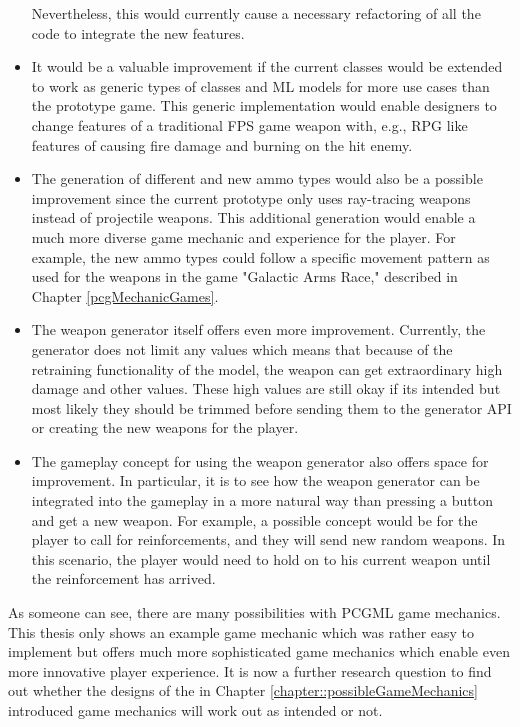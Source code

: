 \documentclass[MGS,Master,english]{twbook}%
\newcommand{\FHTWCitationType}{HARVARD} %
\begin{document}
\begin{itemize}
	Nevertheless, this would currently cause a necessary refactoring of all the code to integrate the new features.
	\item It would be a valuable improvement if the current classes would be extended to work as generic types of classes and \ac{ML} models for more use cases than the prototype game. This generic implementation would enable designers to change features of a traditional \ac{FPS} game weapon with, e.g., \ac{RPG} like features of causing fire damage and burning on the hit enemy.
	\item The generation of different and new ammo types would also be a possible improvement since the current prototype only uses ray-tracing weapons instead of projectile weapons. This additional generation would enable a much more diverse game mechanic and experience for the player. For example, the new ammo types could follow a specific movement pattern as used for the weapons in the game "Galactic Arms Race," described in Chapter \ref{pcgMechanicGames}.
	\item The weapon generator itself offers even more improvement. Currently, the generator does not limit any values which means that because of the retraining functionality of the model, the weapon can get extraordinary high damage and other values. These high values are still okay if its intended but most likely they should be trimmed before sending them to the generator \ac{API} or creating the new weapons for the player.
	\item The gameplay concept for using the weapon generator also offers space for improvement. In particular, it is to see how the weapon generator can be integrated into the gameplay in a more natural way than pressing a button and get a new weapon. For example, a possible concept would be for the player to call for reinforcements, and they will send new random weapons. In this scenario, the player would need to hold on to his current weapon until the reinforcement has arrived.
\end{itemize}
As someone can see, there are many possibilities with \ac{PCGML} game mechanics. This thesis only shows an example game mechanic which was rather easy to implement but offers much more sophisticated game mechanics which enable even more innovative player experience. It is now a further research question to find out whether the designs of the in Chapter \ref{chapter::possibleGameMechanics} introduced game mechanics will work out as intended or not.

%
%
\clearpage
\ifthenelse{\equal{\FHTWCitationType}{HARVARD}}{}{}

\clearpage
\end{document}
